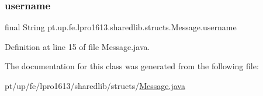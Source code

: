 \subsubsection{\texorpdfstring{username}{username}}
{\footnotesize\ttfamily final String pt.\+up.\+fe.\+lpro1613.\+sharedlib.\+structs.\+Message.\+username}



Definition at line 15 of file Message.\+java.



The documentation for this class was generated from the following file\+:\begin{DoxyCompactItemize}
\item 
pt/up/fe/lpro1613/sharedlib/structs/\hyperlink{_message_8java}{Message.\+java}\end{DoxyCompactItemize}
